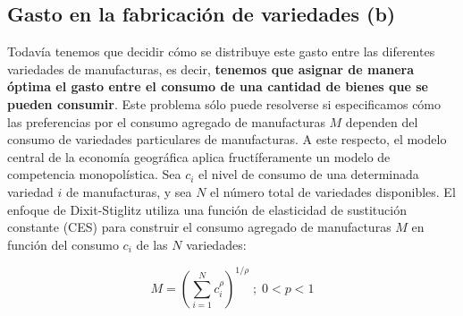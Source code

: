 \subsection{Gasto en la fabricación de variedades (b)}
Todavía tenemos que decidir cómo se distribuye este gasto entre las diferentes variedades de manufacturas, es decir, \textbf{tenemos que asignar de manera óptima el gasto entre el consumo de una cantidad de bienes que se pueden consumir}. Este problema sólo puede resolverse si especificamos cómo las preferencias por el consumo agregado de manufacturas $M$ dependen del consumo de variedades particulares de manufacturas. A este respecto, el modelo central de la economía geográfica aplica fructíferamente un modelo de competencia monopolística. Sea $c_i$ el nivel de consumo de una determinada variedad $i$ de manufacturas, y sea $N$ el número total de variedades disponibles. El enfoque de Dixit-Stiglitz utiliza una función de elasticidad de sustitución constante (CES) para construir el consumo agregado de manufacturas $M$ en función del consumo $c_i$ de las $N$ variedades:

$$M=\left(\sum_{i=1}^N c_i^{\rho} \right)^{1/\rho}\; ; \; 0<p<1$$\\

